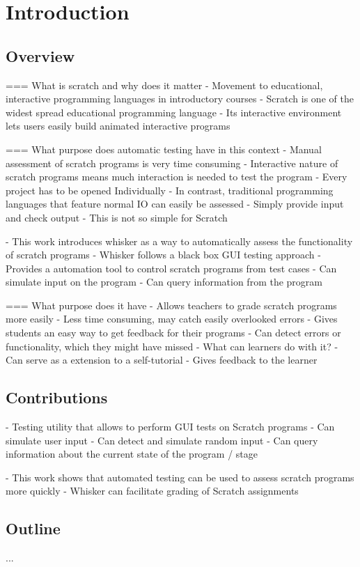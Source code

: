 \section{Introduction}

\subsection{Overview}
=== What is scratch and why does it matter
- Movement to educational, interactive programming languages in introductory courses
- Scratch is one of the widest spread educational programming language
- Its interactive environment lets users easily build animated interactive programs

=== What purpose does automatic testing have in this context
- Manual assessment of scratch programs is very time consuming
- Interactive nature of scratch programs means much interaction is needed to test the program
- Every project has to be opened Individually
- In contrast, traditional programming languages that feature normal IO can easily be assessed
- Simply provide input and check output
- This is not so simple for Scratch

- This work introduces whisker as a way to automatically assess the functionality of scratch programs
- Whisker follows a black box GUI testing approach
- Provides a automation tool to control scratch programs from test cases
    - Can simulate input on the program
    - Can query information from the program

=== What purpose does it have
- Allows teachers to grade scratch programs more easily
    - Less time consuming, may catch easily overlooked errors
    - Gives students an easy way to get feedback for their programs
        - Can detect errors or functionality, which they might have missed
- What can learners do with it?
    - Can serve as a extension to a self-tutorial
    - Gives feedback to the learner

\subsection{Contributions}
- Testing utility that allows to perform GUI tests on Scratch programs
- Can simulate user input
- Can detect and simulate random input
- Can query information about the current state of the program / stage

- This work shows that automated testing can be used to assess scratch programs more quickly
- Whisker can facilitate grading of Scratch assignments

\subsection{Outline}
...

%
